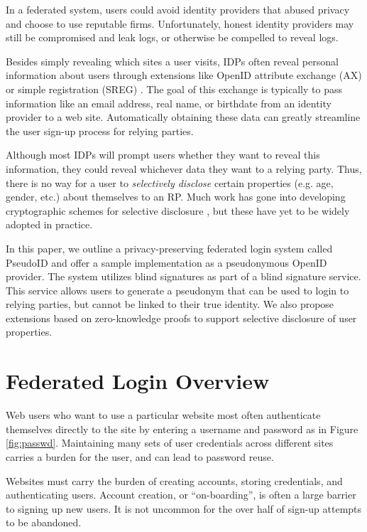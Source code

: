\documentclass{llncs}
\begin{document}
In a federated system, users could avoid identity providers
that abused privacy and choose to use reputable firms. Unfortunately,
honest identity providers may still be compromised and leak logs, or
otherwise be compelled to reveal logs.

Besides simply revealing which sites a user visits, IDPs often reveal
personal information about users through extensions like OpenID
attribute exchange (AX) \cite{AX} or simple registration (SREG)
\cite{Sreg}. The goal of this exchange is typically to pass
information like an email address, real name, or birthdate from an
identity provider to a web site. Automatically obtaining these data
can greatly streamline the user sign-up process for relying parties.

Although most IDPs will prompt users whether they want to reveal this
information, they could reveal whichever data they want to a relying
party. Thus, there is no way for a user to \emph{selectively disclose}
certain properties (e.g. age, gender, etc.) about themselves to an
RP. Much work has gone into developing cryptographic schemes for
selective disclosure \cite{CaLy01,CaLy04,CHL05,CaGr08}, but these have
yet to be widely adopted in practice.

In this paper, we outline a privacy-preserving federated login system
called PseudoID and offer a sample implementation as a pseudonymous
OpenID provider. The system utilizes blind signatures \cite{Cha82} as
part of a blind signature service. This service allows users to
generate a pseudonym that can be used to login to relying parties, but
cannot be linked to their true identity. We also propose 
extensions based on zero-knowledge proofs \cite{GMR89} to support
selective disclosure of user properties.

\section{Federated Login Overview}
\label{sec:fedlogin}

Web users who want to use a particular website most often authenticate
themselves directly to the site by entering a username and
password as in Figure \ref{fig:passwd}. Maintaining many sets of user
credentials across different sites carries a burden for the user, and can
lead to password reuse.

Websites must carry the burden of creating accounts, storing
credentials, and authenticating users. Account creation, or
``on-boarding'', is often a large barrier to signing up new users. It
is not uncommon for the over half of sign-up attempts to be
abandoned. 
\end{document}
